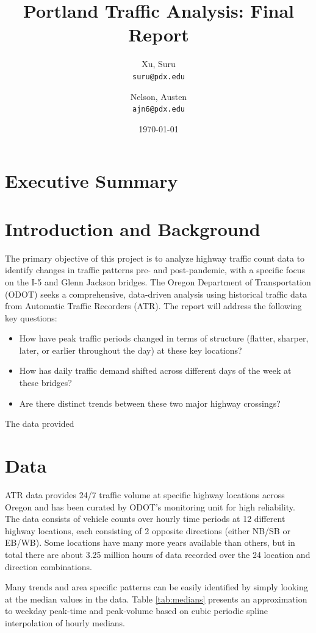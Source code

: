 \documentclass{article}
\title{Portland Traffic Analysis: Final Report}
\author{
  Xu, Suru\\
  \texttt{suru@pdx.edu}
  \and
  Nelson, Austen\\
  \texttt{ajn6@pdx.edu}
}
\date{\today}
\begin{document}
\maketitle

\tableofcontents

\section{Executive Summary}

\section{Introduction and Background}

The primary objective of this project is to analyze highway traffic count data to identify changes in traffic patterns pre- and post-pandemic, with a specific focus on the I-5 and Glenn Jackson bridges. The Oregon Department of Transportation (ODOT) seeks a comprehensive, data-driven analysis using historical traffic data from Automatic Traffic Recorders (ATR). The report will address the following key questions:

\begin{itemize}
    \item How have peak traffic periods changed in terms of structure (flatter, sharper, later, or earlier throughout the day) at these key locations?
    \item How has daily traffic demand shifted across different days of the week at these bridges?
    \item Are there distinct trends between these two major highway crossings?
\end{itemize}

The data provided 
\section{Data}

ATR data provides 24/7 traffic volume at specific highway locations across Oregon and has been curated by ODOT’s monitoring unit for high reliability. The data consists of vehicle counts over hourly time periods at 12 different highway locations, each consisting of 2 opposite directions (either NB/SB or EB/WB). Some locations have many more years available than others, but in total there are about 3.25 million hours of data recorded over the 24 location and direction combinations.

Many trends and area specific patterns can be easily identified by simply looking at the median values in the data. Table \ref{tab:medians} presents an approximation to weekday peak-time and peak-volume based on cubic periodic spline interpolation of hourly medians. 
\end{document}
